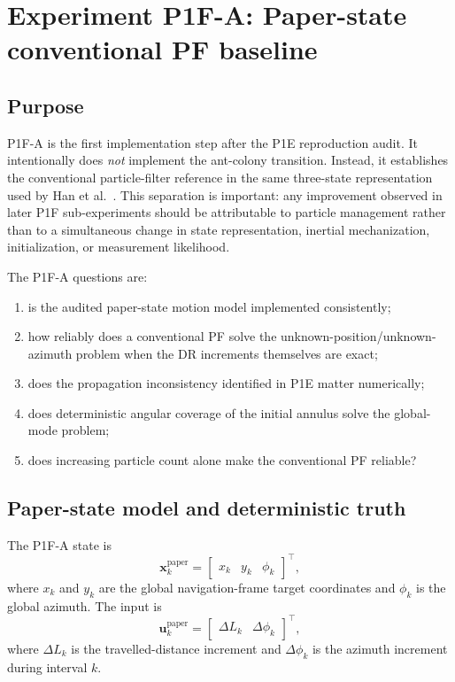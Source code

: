\section{Experiment P1F-A: Paper-state conventional PF baseline}
\subsection{Purpose}
P1F-A is the first implementation step after the P1E reproduction audit. It intentionally does \emph{not} implement the ant-colony transition. Instead, it establishes the conventional particle-filter reference in the same three-state representation used by Han et al.~\cite{han2020cooperative}. This separation is important: any improvement observed in later P1F sub-experiments should be attributable to particle management rather than to a simultaneous change in state representation, inertial mechanization, initialization, or measurement likelihood.

The P1F-A questions are:
\begin{enumerate}
    \item is the audited paper-state motion model implemented consistently;
    \item how reliably does a conventional PF solve the unknown-position/unknown-azimuth problem when the DR increments themselves are exact;
    \item does the propagation inconsistency identified in P1E matter numerically;
    \item does deterministic angular coverage of the initial annulus solve the global-mode problem;
    \item does increasing particle count alone make the conventional PF reliable?
\end{enumerate}

\subsection{Paper-state model and deterministic truth}
The P1F-A state is
\begin{equation}
    \bm x_k^{\mathrm{paper}}
    =
    \begin{bmatrix}
        x_k & y_k & \phi_k
    \end{bmatrix}^{\top},
\end{equation}
where $x_k$ and $y_k$ are the global navigation-frame target coordinates and $\phi_k$ is the global azimuth. The input is
\begin{equation}
    \bm u_k^{\mathrm{paper}}
    =
    \begin{bmatrix}
        \Delta L_k & \Delta\phi_k
    \end{bmatrix}^{\top},
\end{equation}
where $\Delta L_k$ is the travelled-distance increment and $\Delta\phi_k$ is the azimuth increment during interval $k$.

